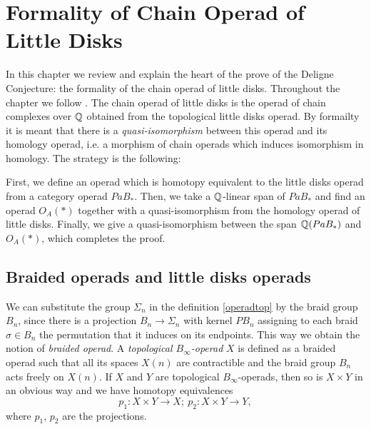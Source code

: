 \documentclass[TFM.tex]{subfiles}
\begin{document}
\chapter{Formality of Chain Operad of Little Disks}



%
%
%


In this chapter we review and explain the heart of the prove of the Deligne Conjecture: the formality of the chain operad of little disks. Throughout the chapter we follow \cite{Tamarkin}. The chain operad of little disks is the operad of chain complexes over $\mathbb{Q}$ obtained from the topological little disks operad. By formailty it is meant that there is a \emph{quasi-isomorphism} between this operad and its homology operad, i.e. a morphism of chain operads which induces isomorphism in homology. The strategy is the following:

 First, we define an operad which is homotopy equivalent to the little disks operad from a category operad $PaB_*$. Then, we take a $\mathbb{Q}$-linear span of $PaB_*$ and find an operad $O_A(*)$ together with a quasi-isomorphism from the homology operad of little disks. Finally, we give a quasi-isomorphism between the span $\mathbb{Q}(PaB_*)$ and $O_A(*)$, which completes the proof. 




\section{Braided operads and little disks operads}

We can substitute the group $\Sigma_n$ in the definition \ref{operadtop} by the braid group $B_n$, since there is a projection $B_n\to \Sigma_n$ with kernel $PB_n$ assigning to each braid $\sigma\in B_n$ the permutation that it induces on its endpoints. This way we obtain the notion of \emph{braided operad}. A \emph{topological $B_\infty$-operad} $X$ is defined as a braided operad such that all its spaces $X(n)$ are contractible and the braid group $B_n$ acts freely on $X(n)$. If $X$ and $Y$ are topological $B_\infty$-operads, then so is $X\times Y$ in an obvious way and we have homotopy equivalences 
\begin{equation}\label{projections}
p_1:X\times Y\to X;\ p_2:X\times Y\to Y,
\end{equation}
where $p_1$, $p_2$ are the projections. 
\end{document}
